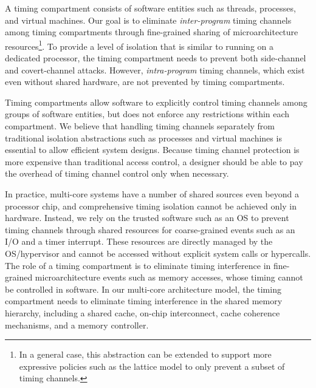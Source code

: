 A timing compartment consists of  
software entities such as threads, processes, and virtual machines.
Our goal is to eliminate {\em inter-program} timing
channels among timing compartments through fine-grained sharing of microarchitecture 
resources\footnote{In a general case, this abstraction can be extended to support
more expressive policies such as the lattice model \cite{denning} to only prevent
a subset of timing channels.}.
To provide a level of isolation that is similar to running on a dedicated processor,
the timing compartment needs to prevent both side-channel and covert-channel attacks.
However, {\em intra-program} timing channels,
which exist even without shared hardware, are not prevented by
timing compartments. 

Timing compartments allow software to explicitly control timing channels
among groups of software entities, but does not enforce any restrictions within
each compartment. We believe that handling timing channels separately from
traditional isolation abstractions such as processes and virtual machines is 
essential to allow efficient system designs. Because timing channel protection
is more expensive than traditional access control, a designer should be able
to pay the overhead of timing channel control only when necessary.

In practice, multi-core systems have a number of shared sources even beyond a
processor chip, and comprehensive timing isolation cannot be achieved only in hardware.
Instead, we rely on the trusted software such as an OS to prevent timing channels 
through shared resources for coarse-grained events such as an I/O and a timer interrupt. 
These resources are directly managed by the OS/hypervisor and cannot be accessed 
without explicit system calls or hypercalls.
The role of a timing compartment is to eliminate
timing interference in fine-grained microarchitecture events such as memory accesses,
whose timing cannot be controlled in software.
In our multi-core architecture model, the timing compartment needs to eliminate
timing interference in the shared memory hierarchy, including a shared cache,
on-chip interconnect, cache coherence mechanisms, and a memory controller.


